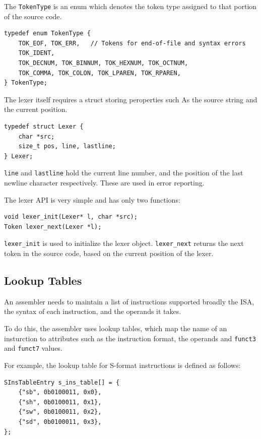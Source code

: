 \documentclass{article}
\begin{document}
The \texttt{TokenType} is an enum which denotes the token type
assigned to that portion of the source code.

\begin{verbatim}    
typedef enum TokenType {
    TOK_EOF, TOK_ERR,   // Tokens for end-of-file and syntax errors
    TOK_IDENT,
    TOK_DECNUM, TOK_BINNUM, TOK_HEXNUM, TOK_OCTNUM,
    TOK_COMMA, TOK_COLON, TOK_LPAREN, TOK_RPAREN,
} TokenType;
\end{verbatim}

The lexer itself requires a struct storing peroperties such As
the source string and the current position. 

\begin{verbatim}
typedef struct Lexer {
    char *src;
    size_t pos, line, lastline;
} Lexer;
\end{verbatim}

\texttt{line} and \texttt{lastline} hold the current line number,
and the position of the last newline character respectively. These
are used in error reporting.

The lexer API is very simple and has only two functions:

\begin{verbatim}
void lexer_init(Lexer* l, char *src);
Token lexer_next(Lexer *l);
\end{verbatim}

\texttt{lexer\_init} is used to initialize the lexer object.
\texttt{lexer\_next} returns the next token in the source code,
based on the current position of the lexer.

\subsection{Lookup Tables}

An assembler needs to maintain a list of instructions supported broadly
the ISA, the syntax of each instruction, and the operands it takes.

To do this, the assembler uses lookup tables, which map the name of
an insturction to attributes such as the instruction format, the operands
and \texttt{funct3} and \texttt{funct7} values.

For example, the lookup table for S-format instructions is defined as
follows:

\begin{verbatim}
SInsTableEntry s_ins_table[] = {
    {"sb", 0b0100011, 0x0},
    {"sh", 0b0100011, 0x1},
    {"sw", 0b0100011, 0x2},
    {"sd", 0b0100011, 0x3},
};
\end{verbatim}
\end{document}
